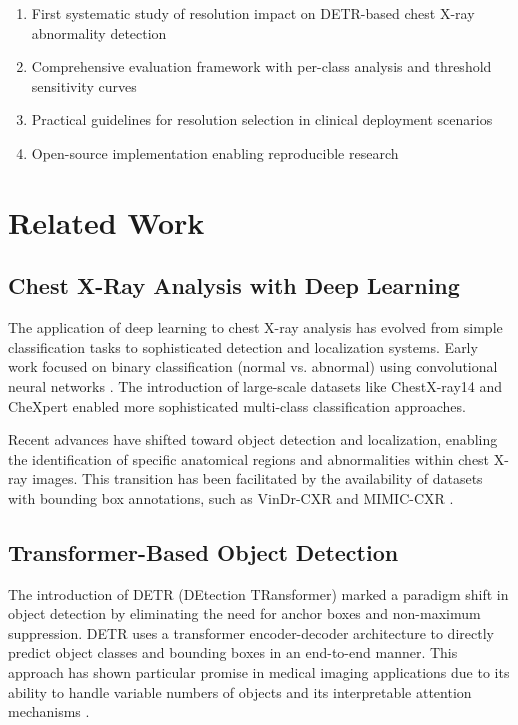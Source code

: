 \documentclass[10pt,twocolumn]{article}
\begin{document}
\begin{enumerate}
\item First systematic study of resolution impact on DETR-based chest X-ray abnormality detection
\item Comprehensive evaluation framework with per-class analysis and threshold sensitivity curves
\item Practical guidelines for resolution selection in clinical deployment scenarios
\item Open-source implementation enabling reproducible research
\end{enumerate}

\section{Related Work}

\subsection{Chest X-Ray Analysis with Deep Learning}

The application of deep learning to chest X-ray analysis has evolved from simple classification tasks to sophisticated detection and localization systems. Early work focused on binary classification (normal vs. abnormal) using convolutional neural networks \cite{wang2017chestxray8}. The introduction of large-scale datasets like ChestX-ray14 \cite{wang2017chestxray14} and CheXpert \cite{irvin2019chexpert} enabled more sophisticated multi-class classification approaches.

Recent advances have shifted toward object detection and localization, enabling the identification of specific anatomical regions and abnormalities within chest X-ray images. This transition has been facilitated by the availability of datasets with bounding box annotations, such as VinDr-CXR \cite{vindr_cxr} and MIMIC-CXR \cite{johnson2019mimic}.

\subsection{Transformer-Based Object Detection}

The introduction of DETR (DEtection TRansformer) \cite{detr} marked a paradigm shift in object detection by eliminating the need for anchor boxes and non-maximum suppression. DETR uses a transformer encoder-decoder architecture to directly predict object classes and bounding boxes in an end-to-end manner. This approach has shown particular promise in medical imaging applications due to its ability to handle variable numbers of objects and its interpretable attention mechanisms \cite{detr_medical}.
\end{document}
